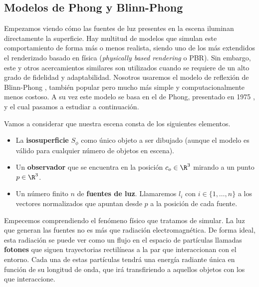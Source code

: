 \subsection{Modelos de Phong y Blinn-Phong}
Empezamos viendo cómo las fuentes de luz presentes en la escena iluminan directamente la superficie. Hay multitud de modelos que simulan este comportamiento de forma más o menos realista, siendo uno de los más extendidos el renderizado basado en física (\textit{physically based rendering} o PBR). Sin embargo, este y otros acercamientos similares son utilizados cuando se requiere de un alto grado de fidelidad y adaptabilidad. Nosotros usaremos el modelo de reflexión de Blinn-Phong \cite{apuntes:ig}, también popular pero mucho más simple y computacionalmente menos costoso. A su vez este modelo se basa en el de Phong, presentado en 1975 \cite{phong}, y el cual pasamos a estudiar a continuación. \newline

Vamos a considerar que nuestra escena consta de los siguientes elementos.
\begin{itemize}
    \item La \textbf{isosuperficie} $S_{\phi}$ como único objeto a ser dibujado (aunque el modelo es válido para cualquier número de objetos en escena).
    \item Un \textbf{observador} que se encuentra en la posición $c_o\in\R^3$ mirando a un punto $p\in \R^3$.
    \item Un número finito $n$ de \textbf{fuentes de luz}. Llamaremos $l_i$ con $i\in \{1,\dots, n\}$ a los vectores normalizados que apuntan desde $p$ a la posición de cada fuente.
\end{itemize}

Empecemos comprendiendo el fenómeno físico que tratamos de simular. La luz que generan las fuentes no es más que radiación electromagnética. De forma ideal, esta radiación se puede ver como un flujo en el espacio de partículas llamadas \textbf{fotones} que siguen trayectorias rectilíneas a la par que interaccionan con el entorno. Cada una de estas partículas tendrá una energía radiante única en función de su longitud de onda, que irá transfiriendo a aquellos objetos con los que interaccione.

